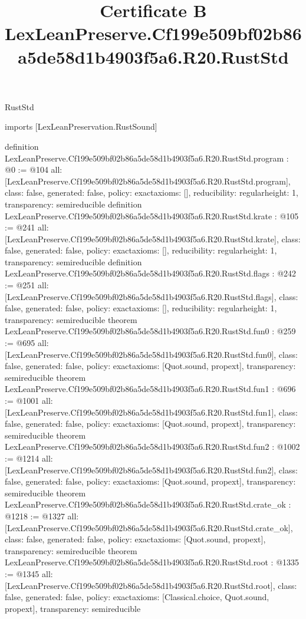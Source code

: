 \begin{lexlean}{RustStd}
\title{Certificate B LexLeanPreserve.Cf199e509bf02b86a5de58d1b4903f5a6.R20.RustStd}
\begin{coremodule}
imports [LexLeanPreservation.RustSound]

definition LexLeanPreserve.Cf199e509bf02b86a5de58d1b4903f5a6.R20.RustStd.program : @0 := @104 {
  all: [LexLeanPreserve.Cf199e509bf02b86a5de58d1b4903f5a6.R20.RustStd.program],
  class: false,
  generated: false,
  policy: exact{axioms: []},
  reducibility: regular{height: 1},
  transparency: semireducible
}
definition LexLeanPreserve.Cf199e509bf02b86a5de58d1b4903f5a6.R20.RustStd.krate : @105 := @241 {
  all: [LexLeanPreserve.Cf199e509bf02b86a5de58d1b4903f5a6.R20.RustStd.krate],
  class: false,
  generated: false,
  policy: exact{axioms: []},
  reducibility: regular{height: 1},
  transparency: semireducible
}
definition LexLeanPreserve.Cf199e509bf02b86a5de58d1b4903f5a6.R20.RustStd.flags : @242 := @251 {
  all: [LexLeanPreserve.Cf199e509bf02b86a5de58d1b4903f5a6.R20.RustStd.flags],
  class: false,
  generated: false,
  policy: exact{axioms: []},
  reducibility: regular{height: 1},
  transparency: semireducible
}
theorem LexLeanPreserve.Cf199e509bf02b86a5de58d1b4903f5a6.R20.RustStd.fun0 : @259 := @695 {
  all: [LexLeanPreserve.Cf199e509bf02b86a5de58d1b4903f5a6.R20.RustStd.fun0],
  class: false,
  generated: false,
  policy: exact{axioms: [Quot.sound, propext]},
  transparency: semireducible
}
theorem LexLeanPreserve.Cf199e509bf02b86a5de58d1b4903f5a6.R20.RustStd.fun1 : @696 := @1001 {
  all: [LexLeanPreserve.Cf199e509bf02b86a5de58d1b4903f5a6.R20.RustStd.fun1],
  class: false,
  generated: false,
  policy: exact{axioms: [Quot.sound, propext]},
  transparency: semireducible
}
theorem LexLeanPreserve.Cf199e509bf02b86a5de58d1b4903f5a6.R20.RustStd.fun2 : @1002 := @1214 {
  all: [LexLeanPreserve.Cf199e509bf02b86a5de58d1b4903f5a6.R20.RustStd.fun2],
  class: false,
  generated: false,
  policy: exact{axioms: [Quot.sound, propext]},
  transparency: semireducible
}
theorem LexLeanPreserve.Cf199e509bf02b86a5de58d1b4903f5a6.R20.RustStd.crate_ok : @1218 := @1327 {
  all: [LexLeanPreserve.Cf199e509bf02b86a5de58d1b4903f5a6.R20.RustStd.crate_ok],
  class: false,
  generated: false,
  policy: exact{axioms: [Quot.sound, propext]},
  transparency: semireducible
}
theorem LexLeanPreserve.Cf199e509bf02b86a5de58d1b4903f5a6.R20.RustStd.root : @1335 := @1345 {
  all: [LexLeanPreserve.Cf199e509bf02b86a5de58d1b4903f5a6.R20.RustStd.root],
  class: false,
  generated: false,
  policy: exact{axioms: [Classical.choice, Quot.sound, propext]},
  transparency: semireducible
}


\end{coremodule}
\end{lexlean}
